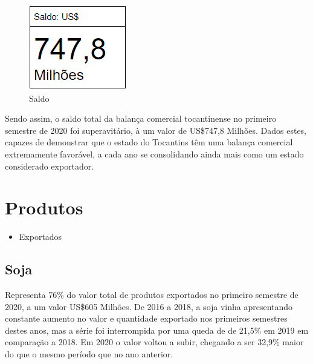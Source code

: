 \begin{figure} [h] \caption{Saldo}
	\includegraphics[width=\linewidth]{fig/saldo0.png}
\end{figure}
\newpage 
\par Sendo assim, o saldo total da balança comercial tocantinense no primeiro semestre de 2020 foi superavitário, à um valor de US\$747,8 Milhões. Dados estes, capazes de demonstrar que o estado do Tocantins têm uma balança comercial extremamente favorável, a cada ano se consolidando ainda mais como um estado considerado exportador.

\section{Produtos}
\begin{itemize}
	\item Exportados
	\end{itemize}

	\subsection{Soja}
\par Representa 76\% do valor total de produtos exportados no primeiro semestre de 2020, a um valor US\$605 Milhões. De 2016 a 2018, a soja vinha apresentando constante aumento no valor e quantidade exportado nos primeiros semestres destes anos, mas a série foi interrompida por uma queda de de 21,5\% em 2019 em comparação a 2018. Em 2020 o valor voltou a subir, chegando a ser 32,9\% maior do que o mesmo período que no ano anterior.

